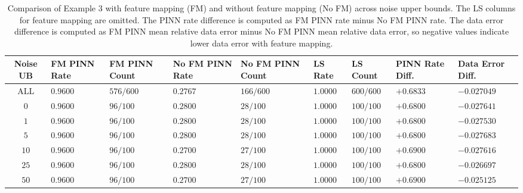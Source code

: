 \documentclass[11pt]{article}
\begin{document}
\begin{table}[H]
\centering
\scriptsize
\renewcommand{\arraystretch}{1.25}
\setlength{\tabcolsep}{3pt}
\begin{tabularx}{\textwidth}{|c|
>{\centering\arraybackslash}X|
>{\centering\arraybackslash}X|
>{\centering\arraybackslash}X|
>{\centering\arraybackslash}X|
>{\centering\arraybackslash}X|
>{\centering\arraybackslash}X|
>{\centering\arraybackslash}X|
>{\centering\arraybackslash}X|}
\hline
\textbf{Noise UB} &
\textbf{FM PINN Rate} &
\textbf{FM PINN Count} &
\textbf{No FM PINN Rate} &
\textbf{No FM PINN Count} &
\textbf{LS Rate} &
\textbf{LS Count} &
\textbf{PINN Rate Diff.} &
\textbf{Data Error Diff.} \\
\hline

ALL
& \(0.9600\) & \(576/600\)
& \(0.2767\) & \(166/600\)
& \(1.0000\) & \(600/600\)
& \(+0.6833\)
& \(-0.027049\) \\
\hline

\(0\)
& \(0.9600\) & \(96/100\)
& \(0.2800\) & \(28/100\)
& \(1.0000\) & \(100/100\)
& \(+0.6800\)
& \(-0.027641\) \\
\hline

\(1\)
& \(0.9600\) & \(96/100\)
& \(0.2800\) & \(28/100\)
& \(1.0000\) & \(100/100\)
& \(+0.6800\)
& \(-0.027530\) \\
\hline

\(5\)
& \(0.9600\) & \(96/100\)
& \(0.2800\) & \(28/100\)
& \(1.0000\) & \(100/100\)
& \(+0.6800\)
& \(-0.027683\) \\
\hline

\(10\)
& \(0.9600\) & \(96/100\)
& \(0.2700\) & \(27/100\)
& \(1.0000\) & \(100/100\)
& \(+0.6900\)
& \(-0.027616\) \\
\hline

\(25\)
& \(0.9600\) & \(96/100\)
& \(0.2800\) & \(28/100\)
& \(1.0000\) & \(100/100\)
& \(+0.6800\)
& \(-0.026697\) \\
\hline

\(50\)
& \(0.9600\) & \(96/100\)
& \(0.2700\) & \(27/100\)
& \(1.0000\) & \(100/100\)
& \(+0.6900\)
& \(-0.025125\) \\
\hline

\end{tabularx}
\caption{Comparison of Example 3 with feature mapping (FM) and without feature mapping (No FM) across noise upper bounds. The LS columns for feature mapping are omitted. The PINN rate difference is computed as FM PINN rate minus No FM PINN rate. The data error difference is computed as FM PINN mean relative data error minus No FM PINN mean relative data error, so negative values indicate lower data error with feature mapping.}
\label{tab:ex3-feature-vs-no-feature}
\end{table}
\end{document}
